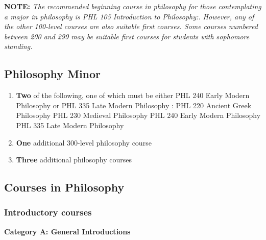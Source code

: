 \documentclass[
  letterpaper,
]{scrbook}
\begin{document}
\textbf{NOTE:} \emph{The recommended beginning course in philosophy for
those contemplating a major in philosophy is PHL 105 Introduction to
Philosophy:. However, any of the other 100-level courses are also
suitable first courses. Some courses numbered between 200 and 299 may be
suitable first courses for students with sophomore standing.}

\hypertarget{philosophy-minor}{%
\subsection{Philosophy Minor}\label{philosophy-minor}}

\begin{enumerate}
\def\labelenumi{\arabic{enumi}.}
\item
  \textbf{Two} of the following, one of which must be either PHL 240
  Early Modern Philosophy or PHL 335 Late Modern Philosophy : PHL 220
  Ancient Greek Philosophy PHL 230 Medieval Philosophy PHL 240 Early
  Modern Philosophy PHL 335 Late Modern Philosophy
\item
  \textbf{One} additional 300-level philosophy course
\item
  \textbf{Three} additional philosophy courses
\end{enumerate}

\hypertarget{courses-in-philosophy}{%
\subsection{Courses in Philosophy}\label{courses-in-philosophy}}

\hypertarget{introductory-courses}{%
\subsubsection*{Introductory courses}\label{introductory-courses}}

\textbf{Category A: General Introductions}
\end{document}
